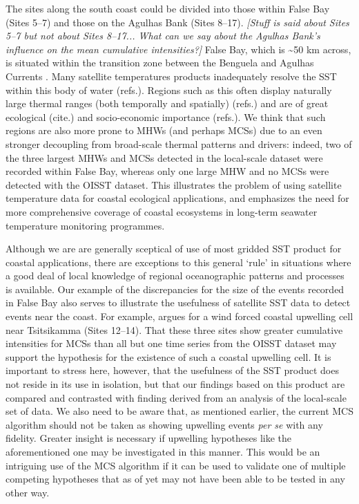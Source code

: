 \documentclass[a4paper,10pt,review]{elsarticle}
\begin{document}
The sites along the south coast could be divided into those within False Bay (Sites 5--7) and those on the Agulhas Bank (Sites 8--17). \emph{[Stuff is said about Sites 5--7 but not about Sites 8--17... What can we say about the Agulhas Bank's influence on the mean cumulative intensities?]} False Bay, which is \textasciitilde50 km across, is situated within the transition zone between the Benguela and Agulhas Currents \citep{Smit2013}. Many satellite temperatures products inadequately resolve the SST within this body of water (refs.). Regions such as this often display naturally large thermal ranges (both temporally and spatially) (refs.) and are of great ecological (cite.) and socio-economic importance (refs.). We think that such regions are also more prone to MHWs (and perhaps MCSs) due to an even stronger decoupling from broad-scale thermal patterns and drivers: indeed, two of the three largest MHWs and MCSs detected in the local-scale dataset were recorded within False Bay, whereas only one large MHW and no MCSs were detected with the OISST dataset. This illustrates the problem of using satellite temperature data for coastal ecological applications, and emphasizes the need for more comprehensive coverage of coastal ecosystems in long-term seawater temperature monitoring programmes.

Although we are are generally sceptical of use of most gridded SST product for coastal applications, there are exceptions to this general `rule' in situations where a good deal of local knowledge of regional oceanographic patterns and processes is available. Our example of the discrepancies for the size of the events recorded in False Bay also serves to illustrate the usefulness of satellite SST data to detect events near the coast. For example, \citet{Roberts2005} argues for a wind forced coastal upwelling cell near Tsitsikamma (Sites 12--14). That these three sites show greater cumulative intensities for MCSs than all but one time series from the OISST dataset may support the hypothesis for the existence of such a coastal upwelling cell. It is important to stress here, however, that the usefulness of the SST product does not reside in its use in isolation, but that our findings based on this product are compared and contrasted with finding derived from an analysis of the local-scale set of data. We also need to be aware that, as mentioned earlier, the current MCS algorithm should not be taken as showing upwelling events \emph{per se} with any fidelity. Greater insight is necessary if upwelling hypotheses like the aforementioned one may be investigated in this manner. This would be an intriguing use of the MCS algorithm if it can be used to validate one of multiple competing hypotheses that as of yet may not have been able to be tested in any other way.
\end{document}
